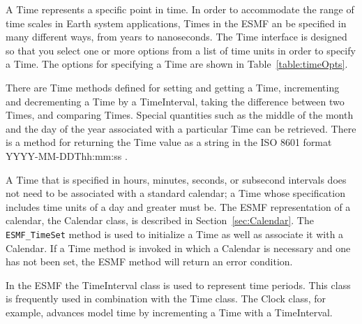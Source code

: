 \label{sec:Time}

A Time represents a specific point in time.  In order to accommodate
the range of time scales in Earth system applications, Times in
the ESMF an be specified in many different ways, from years to 
nanoseconds.  The Time interface is designed so that you select one or 
more options from a list of time units in order to specify a 
Time. The options for specifying a Time are shown in 
Table~\ref{table:timeOpts}.  

There are Time methods defined for setting and getting a
Time, incrementing and decrementing a Time by a TimeInterval,
taking the difference between two Times, and comparing Times.
Special quantities such as the middle of the month and the 
day of the year associated with a particular Time can be retrieved. 
There is a method for returning the Time value as a string in 
the ISO 8601 format YYYY-MM-DDThh:mm:ss \cite{ISO}.

A Time that is specified in hours, minutes, seconds, or subsecond intervals 
does not need to be associated with a standard calendar; a Time whose
specification includes time units of a day and greater must be.  The 
ESMF representation
of a calendar, the Calendar class, is described in Section~\ref{sec:Calendar}.
The {\tt ESMF\_TimeSet} method is used to initialize a Time as well as
associate it with a Calendar.  If a Time method is invoked in which a Calendar
is necessary and one has not been set, the ESMF method will return an error
condition.

In the ESMF the TimeInterval class is used to represent time periods.
This class is frequently used in combination with the Time class.
The Clock class, for example, advances model time by incrementing a
Time with a TimeInterval. 
 




